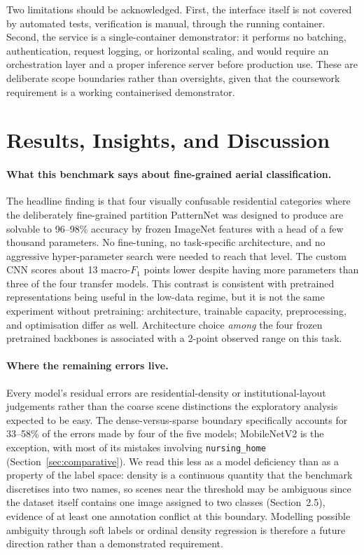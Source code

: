 \documentclass[11pt,twoside,a4paper]{article}
\begin{document}
Two limitations should be acknowledged. First, the interface itself is not
covered by automated tests, verification is manual, through the running
container. Second, the service is a single-container demonstrator: it performs
no batching, authentication, request logging, or horizontal scaling, and would
require an orchestration layer and a proper inference server before production
use. These are deliberate scope boundaries rather than oversights, given that
the coursework requirement is a working containerised demonstrator.

\section{Results, Insights, and Discussion}
\label{sec:discussion}

\paragraph{What this benchmark says about fine-grained aerial classification.}
The headline finding is that four visually confusable residential categories where the deliberately fine-grained partition PatternNet was designed to
produce \cite{Zhou2018} are solvable to 96--98\% accuracy by frozen
ImageNet features with a head of a few thousand parameters. No fine-tuning,
no task-specific architecture, and no aggressive hyper-parameter search were
needed to reach that level. The custom CNN scores about 13 macro-$F_1$ points
lower despite having more parameters than three of the four transfer models.
This contrast is consistent with pretrained representations being useful in
the low-data regime, but it is not the same experiment without pretraining:
architecture, trainable capacity, preprocessing, and optimisation differ as
well. Architecture choice \emph{among} the four frozen pretrained backbones is
associated with a 2-point observed range on this task.

\paragraph{Where the remaining errors live.}
Every model's residual errors are residential-density or institutional-layout
judgements rather than the coarse scene distinctions the exploratory analysis
expected to be easy. The dense-versus-sparse boundary specifically accounts for
33--58\% of the errors made by four of the five models; MobileNetV2 is the
exception, with most of its mistakes involving \texttt{nursing\_home}
(Section~\ref{sec:comparative}). We read this less as a model deficiency than as a property of
the label space: density is a continuous quantity that the benchmark
discretises into two names, so scenes near the threshold may be ambiguous since
the dataset itself contains one image assigned to two classes
(Section~2.5), evidence of at least one annotation conflict at this boundary.
Modelling possible ambiguity through soft labels or ordinal density regression
is therefore a future direction rather than a demonstrated requirement.
\end{document}
